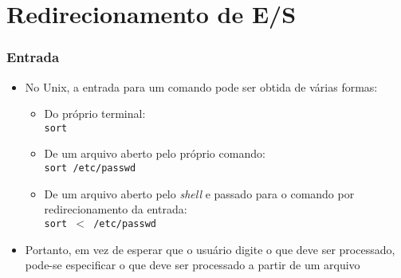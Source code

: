 \documentclass[aspectratio=169]{beamer}
\begin{document}
\section{Redirecionamento de E/S}

\begin{frame}\frametitle{Entrada}
\begin{itemize}
	\item No Unix, a entrada para um comando pode ser obtida de várias formas:\\
	\begin{itemize}
		\item Do próprio terminal:\\
\texttt{sort}
		\item De um arquivo aberto pelo próprio comando:\\
\texttt{sort /etc/passwd}
		\item De um arquivo aberto pelo \emph{shell} e passado para o comando por redirecionamento da entrada:\\
\texttt{sort $<$ /etc/passwd}
	\end{itemize}
	\item Portanto, em vez de esperar que o usuário digite o que deve ser processado, pode-se especificar o que deve ser processado a partir de um arquivo
\end{itemize}
\end{frame}
\end{document}
